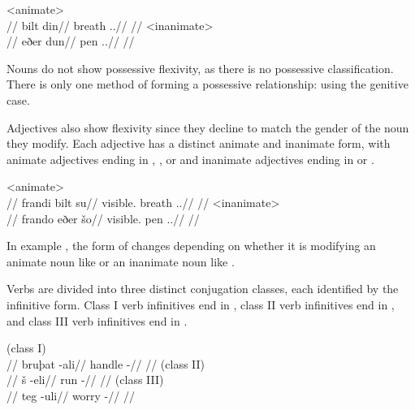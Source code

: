 	\a<animate>\begingl
		\glpreamble{}\\
		//
		\gla bilt din//
		\glb breath \An.\Pl.\Erg//
		\glft {}//
	\endgl
	\a<inanimate>\begingl
		\glpreamble{}\\
		//
		\gla eðer dun//
		\glb pen \In.\Pl.\Erg//
		\glft {}//
	\endgl
\xe

Nouns do not show possessive flexivity, as there is no possessive classification\autocite{wals-59}. There is only one method of forming a possessive relationship: using the genitive case.

Adjectives also show flexivity since they decline to match the gender of the noun they modify. Each adjective has a distinct animate and inanimate form, with animate adjectives ending in , , or  and inanimate adjectives ending in  or .

	\a<animate>\begingl
		\glpreamble{}\\
		//
		\gla frandi bilt su//
		\glb visible.\An{} breath \An.\Sg.\Gen//
		\glft {}//
	\endgl
	\a<inanimate>\begingl
		\glpreamble{}\\
		//
		\gla frando eðer šo//
		\glb visible.\In{} pen \In.\Sg.\Gen//
		\glft {}//
	\endgl
\xe

In example , the form of  changes depending on whether it is modifying an animate noun like  or an inanimate noun like .

Verbs are divided into three distinct conjugation classes, each identified by the infinitive form. Class I verb infinitives end in , class II verb infinitives end in , and class III verb infinitives end in .

	\begingl
		\glpreamble{} (class I)\\
		//
		\gla bruþat -ali//
		\glb handle -\Inf//
		\glft {}//
	\endgl
	\a<cl2>\begingl
		\glpreamble{} (class II)\\
		//
		\gla š -eli//
		\glb run -\Inf//
		\glft {}//
	\endgl
	\a<cl3>\begingl
		\glpreamble{} (class III)\\
		//
		\gla teg -uli//
		\glb worry -\Inf//
		\glft {}//
	\endgl
\xe

